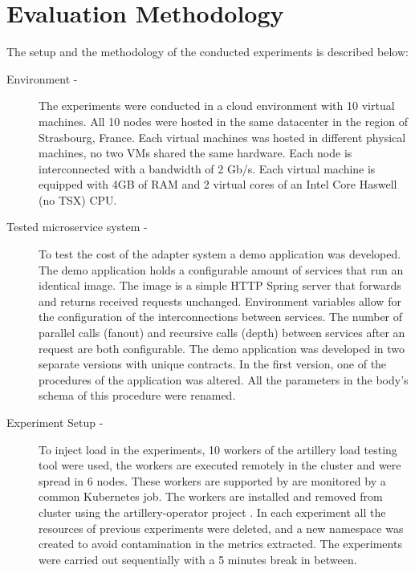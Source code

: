 \section{Evaluation Methodology} %
\label{sec:evaluation_methodology}

The setup and the methodology of the conducted experiments is described below:

\begin{description}
    \item[Environment -] The experiments were conducted in a cloud environment with 10 virtual machines.
    All 10 nodes were hosted in the same datacenter in the region of Strasbourg, France.
    Each virtual machines was hosted in different physical machines, no two VMs shared the same hardware.
    Each node is interconnected with a bandwidth of 2 Gb/s.
    Each virtual machine is equipped with 4GB of RAM and 2 virtual cores of an Intel Core Haswell (no TSX) CPU.
    \item[Tested microservice system -] To test the cost of the adapter system a demo application was developed.
    The demo application holds a configurable amount of services that run an identical image.
    The image is a simple HTTP Spring server that forwards and returns received requests unchanged.
    Environment variables allow for the configuration of the interconnections between services.
    The number of parallel calls (fanout) and recursive calls (depth) between services after an request are both configurable.
    The demo application was developed in two separate versions with unique contracts.
    In the first version, one of the procedures of the application was altered.
    All the parameters in the body's schema of this procedure were renamed.
    \item[Experiment Setup -] To inject load in the experiments, 10 workers of the artillery load testing tool were used,
    the workers are executed remotely in the cluster and were spread in 6 nodes.
    These workers are supported by are monitored by a common Kubernetes job.
    The workers are installed and removed from cluster using the artillery-operator project \cite{artilleryop}.
    In each experiment all the resources of previous experiments were deleted,
    and a new namespace was created to avoid contamination in the metrics extracted.
    The experiments were carried out sequentially with a 5 minutes break in between.


\end{description}
